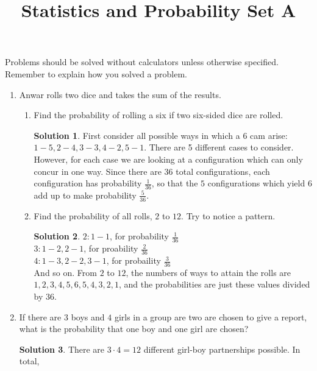 \documentclass{article}
\title{Statistics and Probability Set A}
\date{}
\author{}
\theoremstyle{definition}
\newtheorem*{solution}{Solution}
\begin{document}
    \maketitle
    \noindent Problems should be solved without calculators unless otherwise
    specified. Remember to explain how you solved a problem.
    \begin{enumerate}
        \item Anwar rolls two dice and takes the sum of the results.
            \begin{enumerate}
                \item Find the probability of rolling a six if two six-sided dice are rolled.
                \begin{solution}
                    First consider all possible ways in which a $6$ cam arise:
                    $1-5, 2-4, 3-3, 4-2, 5-1$.  There are 5 different cases to
                    consider. However, for each case we are looking at a
                    configuration which can only concur in one way. Since there
                    are 36 total configurations, each configuration has
                    probability $\frac{1}{36}$, so that the $5$ configurations
                    which yield 6 add up to make probability $\frac{5}{36}$.
                \end{solution}
            \item Find the probability of all rolls, $2$ to $12$. Try to notice a pattern.
                \begin{solution}
                    $2: 1-1$, for probability $\frac{1}{36}$ \\
                    $3: 1-2, 2-1$, for proability $\frac{2}{36}$ \\
                    $4: 1-3, 2-2, 3-1$, for probaility $\frac{3}{36}$ \\
                    And so on. From $2$ to $12$, the numbers of ways to attain the rolls are
                    $1, 2, 3, 4, 5, 6, 5, 4, 3, 2, 1$, and the probabilities are just these
                    values divided by $36$.
                \end{solution}
        \end{enumerate} 
        \item If there are $3$ boys and $4$ girls in a group are two are chosen to give a report,
        what is the probability that one boy and one girl are chosen?
        \begin{solution}
            There are $3\cdot4 = 12$ different girl-boy partnerships possible. In total,

\end{solution}
\end{enumerate}
\end{document}
